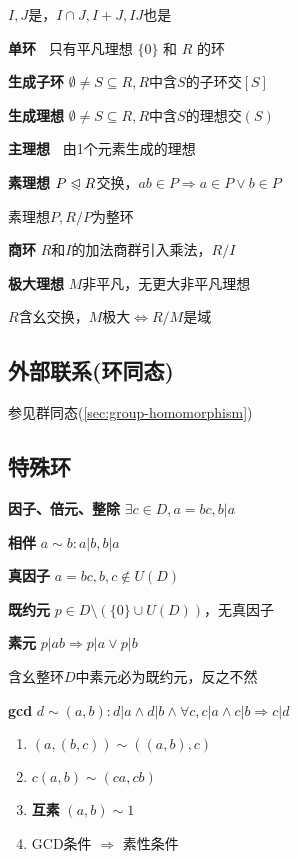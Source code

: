 \documentclass[b4paper, 10pt]{ctexart}
\newcommand*{\impl}{\Rightarrow}
\renewcommand*{\iff}{\Leftrightarrow}
\newcommand*{\nmsubgroupeq}{\trianglelefteqslant}
\newcommand*{\genring}[1]{[#1]}
\newcommand*{\genideal}[1]{(#1)}
\begin{document}
\begin{multicols}{3}
    \begin{theorem}[理想运算律]
        $I, J$是，$I \cap J, I + J, IJ$也是
    \end{theorem}

    \textbf{单环\ } 只有平凡理想 $\{0\}$ 和 $R$ 的环

    \textbf{生成子环} $\emptyset \!\neq\! S \!\subseteq\! R, R$中含$\!S\!$的子环交$\genring{S}$

    \textbf{生成理想} $\emptyset \!\neq\! S \!\subseteq\! R, R$中含$\!S\!$的理想交$\genideal{S}$

    \textbf{主理想\ } 由1个元素生成的理想

    \textbf{素理想} $P \nmsubgroupeq R$交换，$ab \in P \impl a \in P \vee b \in P$

    素理想$P, R/P$为整环

    \textbf{商环} $R$和$I$的加法商群引入乘法，$R/I$

    \textbf{极大理想} $M$非平凡，无更大非平凡理想

    $R$含幺交换，$M$极大$\iff R/M$是域

    \subsection{外部联系(环同态)}

    参见群同态(\ref{sec:group-homomorphism})

    \subsection{特殊环}

    \textbf{因子、倍元、整除} $\exists c \in D, a = bc, b | a$

    \textbf{相伴} $a \sim b: a | b, b | a$

    \textbf{真因子} $a = bc, b, c \notin U(D)$

    \textbf{既约元} $p \in D \setminus (\{ 0 \} \cup U(D))$，无真因子

    \textbf{素元} $p | ab \impl p | a \vee p | b$

    含幺整环$D$中素元必为既约元，反之不然

    \textbf{gcd} $d \sim (a, b): d|a \wedge d|b \wedge \forall c, c|a \wedge c|b \impl c|d$

    \begin{theorem}[gcd性质]
        \hfil

        \begin{enumerate}
            \item $(a, (b, c)) \sim ((a, b), c)$
            \item $c(a, b) \sim (ca, cb)$
            \item \textbf{互素} $(a, b) \sim 1$
            \item GCD条件 $\impl$ 素性条件
        \end{enumerate}
    \end{theorem}


\end{multicols}
\end{document}
